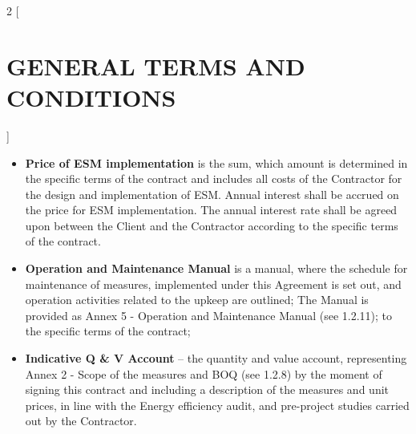 \begin{multicols}{2} [\section{GENERAL TERMS AND CONDITIONS}]
\begin{itemize}[label={}]
    contract.
  \item\textbf{Price of ESM implementation} is the sum, which amount
    is determined in the specific terms of the contract and includes
    all costs of the Contractor for the design and implementation of
    ESM. Annual interest shall be accrued on the price for ESM
    implementation. The annual interest rate shall be agreed upon
    between the Client and the Contractor according to the specific
    terms of the contract.
  \item\textbf{Operation and Maintenance Manual} is a manual, where
    the schedule for maintenance of measures, implemented under this
    Agreement is set out, and operation activities related to the
    upkeep are outlined; The Manual is provided as Annex 5 {-}
    Operation and Maintenance Manual (see 1.2.11); to the specific
    terms of the contract;
  \item\textbf{Indicative Q \& V Account} {–} the quantity and value
    account, representing Annex 2 {-} Scope of the measures and BOQ
    (see 1.2.8) by the moment of signing this contract and including a
    description of the measures and unit prices, in line with the
    Energy efficiency audit, and pre-project studies carried out by
    the Contractor.
  \end{itemize}


\end{multicols}
